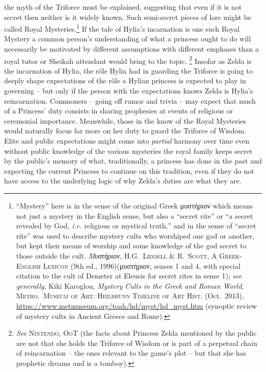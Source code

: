 \documentclass[../FGP.tex]{subfiles}
\begin{document}
the myth of the Triforce must be explained, suggesting that even if it is not secret then neither is it widely known. Such semi-secret pieces of lore might be called Royal Mysteries.\footnote{``Mystery'' here is in the sense of the original Greek {\Gr μυστήριον} which means not just a mystery in the English sense, but also a ``secret rite'' or ``a secret revealed by God, \emph{i.e.} religious or mystical truth,'' and in the sense of ``secret rite'' was used to describe mystery cults who worshiped one god or another, but kept their means of worship and some knowledge of the god secret to those outside the cult. \textit{\Gr Μυστήριον}, \textsc{H.G.~Liddell \& R.~Scott, A Greek-English Lexicon} (9th ed., 1996)({\Gr μυστήριον}, senses 1 and 4, with special citation to the cult of Demeter at Eleusis for secret rites in sense 1); \textit{see generally}, Kiki Karoglou, \textit{Mystery Cults in the Greek and Roman World}, \textsc{Metro.~Museum of Art: Heilbrunn Timeline of Art Hist.} (Oct.~2013), \url{https://www.metmuseum.org/toah/hd/myst/hd_myst.htm} (synoptic review of mystery cults in Ancient Greece and Rome).} If the tale of Hylia's incarnation is one such Royal Mystery a common person's understanding of what a princess ought to do will necessarily be motivated by different assumptions with different emphases than a royal tutor or Sheikah attendant would bring to the topic.%
  \footnote{\textit{See} \textsc{Nintendo, OoT} (the facts about Princess Zelda mentioned by the public are not that she holds the Triforce of Wisdom or is part of a perpetual chain of reincarnation -- the ones relevant to the game's plot -- but that she has prophetic dreams and is a tomboy).}
Insofar as Zelda is the incarnation of Hylia, the r\^ole Hylia had in guarding the Triforce is going to deeply shape expectations of the r\^ole a Hylian princess is expected to play in governing -- but only if the person with the expectations knows Zelda is Hylia's reincarnation. Commoners -- going off rumor and trivia -- may expect that much of a Princess' duty consists in sharing prophesies at events of religious or ceremonial importance. Meanwhile, those in the know of the Royal Mysteries would naturally focus far more on her duty to guard the Triforce of Wisdom. Elite and public expectations might come into \emph{partial} harmony over time even without public knowledge of the various mysteries the royal family keeps secret by the public's memory of what, traditionally, a princess has done in the past and expecting the current Princess to continue on this tradition, even if they do not have access to the underlying logic of why Zelda's duties are what they are.%
\end{document}
